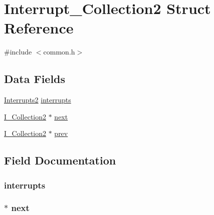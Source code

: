 \hypertarget{struct_interrupt___collection2}{}\section{Interrupt\+\_\+\+Collection2 Struct Reference}
\label{struct_interrupt___collection2}


{\ttfamily \#include $<$common.\+h$>$}

\subsection*{Data Fields}
\begin{DoxyCompactItemize}
\item 
\hyperlink{common_8h_a9400321659cf06efa92dfce5f22a781c}{Interrupts2} \hyperlink{struct_interrupt___collection2_afe6ba6f316b71531f258a7b5d8206e8f}{interrupts}
\item 
\hyperlink{common_8h_a76ec70ab5b7f9f59daf2ac63d0bd0e80}{I\+\_\+\+Collection2} $\ast$ \hyperlink{struct_interrupt___collection2_ad1260e63c64495d53a6d560e0de81354}{next}
\item 
\hyperlink{common_8h_a76ec70ab5b7f9f59daf2ac63d0bd0e80}{I\+\_\+\+Collection2} $\ast$ \hyperlink{struct_interrupt___collection2_ac36f4dac4ba924b695f6253546a9b9ba}{prev}
\end{DoxyCompactItemize}


\subsection{Field Documentation}
\subsubsection[{\texorpdfstring{interrupts}{interrupts}}]{ interrupts}\hypertarget{struct_interrupt___collection2_afe6ba6f316b71531f258a7b5d8206e8f}{}\label{struct_interrupt___collection2_afe6ba6f316b71531f258a7b5d8206e8f}
\subsubsection[{\texorpdfstring{next}{next}}]{$\ast$ next}\hypertarget{struct_interrupt___collection2_ad1260e63c64495d53a6d560e0de81354}{}\label{struct_interrupt___collection2_ad1260e63c64495d53a6d560e0de81354}

